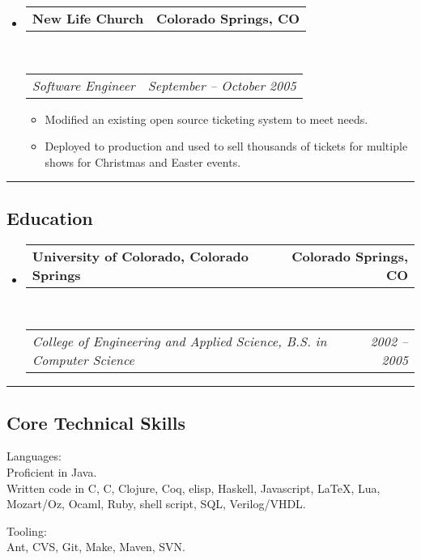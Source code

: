 \documentclass[10pt,letterpaper]{article}
\makeatletter
\newenvironment{indentsection}[1]%
{\begin{list}{}%
	{\setlength{\leftmargin}{#1}}%
	\item[]%
}
{\end{list}}
\newcommand{\headerrow}[2]
{\begin{tabular*}{\linewidth}{l@{\extracolsep{\fill}}r}
	#1 &
	#2 \\
\end{tabular*}}
\newcommand{\CPP}
{C\nolinebreak[4]\hspace{-.05em}\raisebox{.22ex}{\footnotesize\bf ++}}
\makeatother
\begin{document}
\begin{itemize}
	\item
	\headerrow
		{\textbf{New Life Church}}
		{\textbf{Colorado Springs, CO}}
	\\
	\headerrow
		{\emph{Software Engineer}}
		{\emph{September -- October 2005}}
	\begin{itemize}
		\item Modified an existing open source ticketing system to meet needs.
		\item Deployed to production and used to sell thousands of tickets for multiple shows for Christmas and Easter events.
	\end{itemize}

\end{itemize}


\hrule
\vspace{-0.4em}
\subsection*{Education}

\begin{itemize}
	\parskip=0.1em

	\item
	\headerrow
		{\textbf{University of Colorado, Colorado Springs}}
		{\textbf{Colorado Springs, CO}}
	\\
	\headerrow
		{\emph{College of Engineering and Applied Science, B.S. in Computer Science}}
		{\emph{2002 -- 2005}}

\end{itemize}


\hrule
\vspace{-0.4em}
\subsection*{Core Technical Skills}

\begin{indentsection}{\parindent}
\begin{description*}
	\item[Languages:] \ \\
	Proficient in Java. \\
	Written code in C, \CPP, Clojure, Coq, elisp, Haskell, Javascript, \LaTeX, Lua, Mozart/Oz, Ocaml, Ruby, shell script, SQL, Verilog/VHDL.
	\item[Tooling:] \ \\
	Ant, CVS, Git, Make, Maven, SVN. \\
\end{description*}
\end{indentsection}
\end{document}
